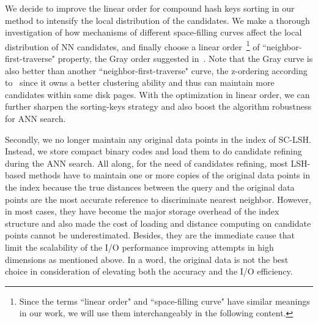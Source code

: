 \documentclass[twocolumn]{svjour3}          %
\begin{document}
We decide to improve the linear order for compound hash keys sorting in our method to intensify the local distribution of the candidates. We make a thorough investigation of how mechanisms of different space-filling curves affect the local distribution of NN candidates, and finally choose a linear order~\footnote{Since the terms ``linear order" and ``space-filling curve" have similar meanings in our work, we will use them interchangeably in the following content.} of ``neighbor-first-traverse" property, the Gray order suggested in~\cite{Faloutsos1986Gray}. Note that the Gray curve is also better than another ``neighbor-first-traverse" curve, the z-ordering according to~\cite{Moon2001SFCClustering} since it owns a better clustering ability and thus can maintain more candidates within same disk pages. With the optimization in linear order, we can further sharpen the sorting-keys strategy and also boost the algorithm robustness for ANN search.

Secondly, we no longer maintain any original data points in the index of SC-LSH. Instead, we store compact binary codes and load them to do candidate refining during the ANN search.
All along, for the need of candidates refining, most LSH-based methods have to maintain one or more copies of the original data points in the index because the true distances between the query and the original data points are the most accurate reference to discriminate nearest neighbor. However, in most cases, they have become the major storage overhead of the index structure and also made the cost of loading and distance computing on candidate points cannot be underestimated. Besides, they are the immediate cause that limit the scalability of the I/O performance improving attempts in high dimensions as mentioned above. In a word, the original data is not the best choice in consideration of elevating both the accuracy and the I/O efficiency.
\end{document}
